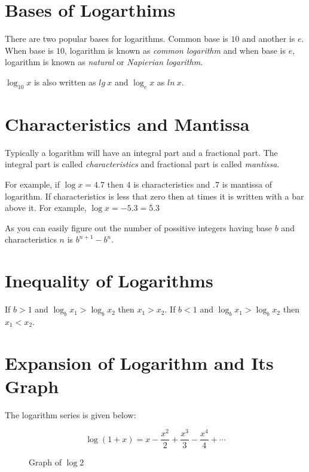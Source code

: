 \section{Bases of Logarthims}
There are two popular bases for logarithms. Common base is $10$ and another is $e$. When base is $10$, logarithm is known as
\textit{common logarithm} and when base is $e$, logarithm is known as \textit{natural} or \textit{Napierian logarithm}.

$\log_{10}x$ is also written as $lg~x$ and $\log_ex$ as $ln~x$.

\section{Characteristics and Mantissa}
Typically a logarithm will have an integral part and a fractional part. The integral part is called \textit{characteristics} and
fractional part is called \textit{mantissa}.

For example, if $\log x = 4.7$ then $4$ is characteristics and $.7$ is mantissa of logarithm. If characteristics is less that zero
then at times it is written with a bar above it. For example, $\log x=-5.3=\overline{5}.3$

As you can easily figure out the number of possitive integers having base $b$ and characteristics $n$ is $b^{n + 1} - b^n$.

\section{Inequality of Logarithms}
If $b > 1$ and $\log_bx_1 > \log_bx_2$ then $x_1 > x_2$. If $b < 1$ and $\log_bx_1 > \log_bx_2$ then $x_1 < x_2$.

\section{Expansion of Logarithm and Its Graph}
The logarithm series is given below:

$$\log(1 + x) = x - \frac{x^2}{2} + \frac{x^3}{3} - \frac{x^4}{4} + \cdots$$

\begin{figure}[H]
\begin{center}
  \caption{Graph of $\log 2$}
\end{center}
\end{figure}

